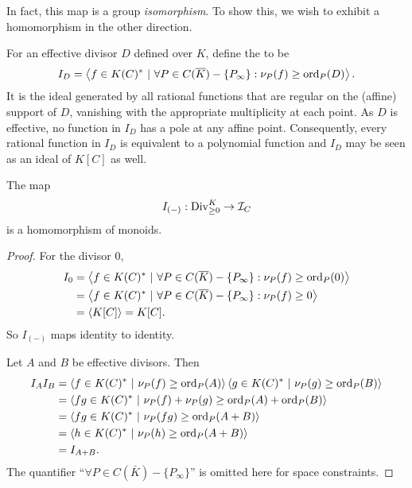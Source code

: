 In fact, this map is a group \emph{isomorphism}.
To show this, we wish to exhibit a homomorphism in the other direction.

For an effective divisor $D$ defined over $K$, define the  to be
\[ I_D = \left\langle  f \in K(C)^* ~|~ \forall P \in C(\overline K) - \{P_\infty\} : \nu_P(f) \geq \operatorname{ord}_P(D)  \right\rangle. \]
It is the ideal generated by all rational functions that are regular on the (affine) support of $D$,
vanishing with the appropriate multiplicity at each point.
As $D$ is effective, no function in $I_D$ has a pole at any affine point.
Consequently, every rational function in $I_D$ is equivalent to a polynomial function
and $I_D$ may be seen as an ideal of $K[C]$ as well.

\begin{proposition}
  The map
  \[ I_{(-)} : \operatorname{Div}_{\geq 0}^K \to \mathcal{I}_C \]
  is a homomorphism of monoids.
\end{proposition}
\begin{proof}
  For the divisor $0$,
  \begin{align*}
    I_0 &= \left\langle  f \in K(C)^* ~|~ \forall P \in C(\overline K) - \{P_\infty\} : \nu_P(f) \geq \operatorname{ord}_P(0)  \right\rangle \\
        &= \left\langle  f \in K(C)^* ~|~ \forall P \in C(\overline K) - \{P_\infty\} : \nu_P(f) \geq 0  \right\rangle \\
        &= \left\langle  K[C]  \right\rangle = K[C].
  \end{align*}
  So $I_{(-)}$ maps identity to identity.
  
  Let $A$ and $B$ be effective divisors. Then
  \begin{align*}
    I_AI_B &= \left\langle  f \in K(C)^* ~|~ \nu_P(f) \geq \operatorname{ord}_P(A)  \right\rangle \left\langle  g \in K(C)^* ~|~ \nu_P(g) \geq \operatorname{ord}_P(B)  \right\rangle \\
           &= \left\langle  fg \in K(C)^* ~|~ \nu_P(f) + \nu_P(g) \geq \operatorname{ord}_P(A) + \operatorname{ord}_P(B)  \right\rangle \\
           &= \left\langle  fg \in K(C)^* ~|~ \nu_P(fg) \geq \operatorname{ord}_P(A + B) \right\rangle \\
           &= \left\langle  h \in K(C)^* ~|~ \nu_P(h) \geq \operatorname{ord}_P(A + B) \right\rangle \\
           &= I_{A+B}.
  \end{align*}
  The quantifier ``$\forall P \in C(\bar K) - \{P_\infty\}$'' is omitted here for space constraints.
\end{proof}

